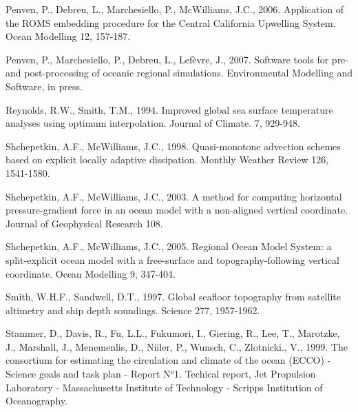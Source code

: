 Penven, P., Debreu, L., Marchesiello,  P., McWilliams, J.C.,
2006.
Application of the ROMS embedding procedure for the Central 
California Upwelling System.
Ocean Modelling
12, 157-187.

Penven, P., Marchesiello, P., Debreu, L., Lef\`evre, J.,
2007.
Software tools for pre- and post-processing of oceanic regional 
simulations.
Environmental Modelling and Software,
in press.

Reynolds, R.W., Smith, T.M., 1994. 
Improved global sea surface temperature
analyses using optimum interpolation. 
Journal of Climate.
7, 929-948.

Shchepetkin, A.F., McWilliams, J.C.,
1998.
Quasi-monotone advection schemes based on explicit locally
adaptive dissipation.
Monthly Weather Review
126,
1541-1580.

Shchepetkin, A.F., McWilliams, J.C.,
2003.
A method for computing horizontal pressure-gradient force
in an ocean model with a non-aligned vertical coordinate.
Journal of Geophysical Research
108.

Shchepetkin, A.F., McWilliams, J.C.,
2005.
Regional Ocean Model System: a split-explicit ocean model with a
free-surface and topography-following vertical coordinate.
Ocean Modelling
9, 347-404.

Smith, W.H.F., Sandwell, D.T.,
1997.
Global seafloor topography from satellite altimetry and ship depth soundings.
Science
277,
1957-1962.

Stammer, D., Davis, R., Fu, L.L., Fukumori, I., Giering, R., Lee, T.,
Marotzke, J., Marshall, J., Menemenlis, D., Niiler, P., Wunsch, C.,
Zlotnicki., V., 1999. 
The consortium for estimating the circulation and
climate of the ocean ({ECCO}) - {Science goals} and task plan - {Report
N$^o$1}. 
Techical report, 
Jet Propulsion Laboratory - Massachusetts Institute of
 Technology - Scripps Institution of Oceanography.
